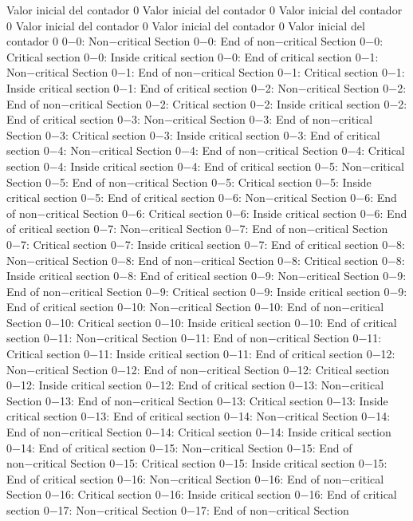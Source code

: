 Valor inicial del contador 0
Valor inicial del contador 0
Valor inicial del contador 0
Valor inicial del contador 0
Valor inicial del contador 0
Valor inicial del contador 0
0−0: Non−critical Section
0−0: End of non−critical Section
0−0: Critical section
0−0: Inside critical section
0−0: End of critical section
0−1: Non−critical Section
0−1: End of non−critical Section
0−1: Critical section
0−1: Inside critical section
0−1: End of critical section
0−2: Non−critical Section
0−2: End of non−critical Section
0−2: Critical section
0−2: Inside critical section
0−2: End of critical section
0−3: Non−critical Section
0−3: End of non−critical Section
0−3: Critical section
0−3: Inside critical section
0−3: End of critical section
0−4: Non−critical Section
0−4: End of non−critical Section
0−4: Critical section
0−4: Inside critical section
0−4: End of critical section
0−5: Non−critical Section
0−5: End of non−critical Section
0−5: Critical section
0−5: Inside critical section
0−5: End of critical section
0−6: Non−critical Section
0−6: End of non−critical Section
0−6: Critical section
0−6: Inside critical section
0−6: End of critical section
0−7: Non−critical Section
0−7: End of non−critical Section
0−7: Critical section
0−7: Inside critical section
0−7: End of critical section
0−8: Non−critical Section
0−8: End of non−critical Section
0−8: Critical section
0−8: Inside critical section
0−8: End of critical section
0−9: Non−critical Section
0−9: End of non−critical Section
0−9: Critical section
0−9: Inside critical section
0−9: End of critical section
0−10: Non−critical Section
0−10: End of non−critical Section
0−10: Critical section
0−10: Inside critical section
0−10: End of critical section
0−11: Non−critical Section
0−11: End of non−critical Section
0−11: Critical section
0−11: Inside critical section
0−11: End of critical section
0−12: Non−critical Section
0−12: End of non−critical Section
0−12: Critical section
0−12: Inside critical section
0−12: End of critical section
0−13: Non−critical Section
0−13: End of non−critical Section
0−13: Critical section
0−13: Inside critical section
0−13: End of critical section
0−14: Non−critical Section
0−14: End of non−critical Section
0−14: Critical section
0−14: Inside critical section
0−14: End of critical section
0−15: Non−critical Section
0−15: End of non−critical Section
0−15: Critical section
0−15: Inside critical section
0−15: End of critical section
0−16: Non−critical Section
0−16: End of non−critical Section
0−16: Critical section
0−16: Inside critical section
0−16: End of critical section
0−17: Non−critical Section
0−17: End of non−critical Section
